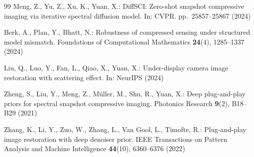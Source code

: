 \documentclass[runningheads]{llncs}
\begin{document}
\begin{thebibliography}{99}
Meng, Z., Yu, Z., Xu, K., Yuan, X.:
DiffSCI: Zero-shot snapshot compressive imaging via iterative spectral diffusion model.
In: CVPR. pp.~25857--25867 (2024)

Berk, A., Plan, Y., Bhatt, N.:
Robustness of compressed sensing under structured model mismatch.
Foundations of Computational Mathematics \textbf{24}(4), 1285--1337 (2024)

Liu, Q., Luo, Y., Fan, L., Qiao, X., Yuan, X.:
Under-display camera image restoration with scattering effect.
In: NeurIPS (2024)

Zheng, S., Liu, Y., Meng, Z., M{\"u}ller, M., Shu, R., Yuan, X.:
Deep plug-and-play priors for spectral snapshot compressive imaging.
Photonics Research \textbf{9}(2), B18--B29 (2021)

Zhang, K., Li, Y., Zuo, W., Zhang, L., Van Gool, L., Timofte, R.:
Plug-and-play image restoration with deep denoiser prior.
IEEE Transactions on Pattern Analysis and Machine Intelligence \textbf{44}(10), 6360--6376 (2022)

\end{thebibliography}
\end{document}
